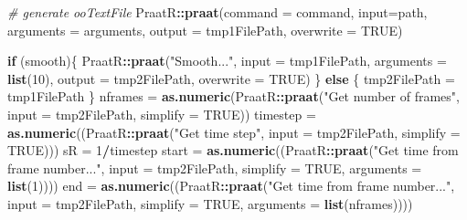 \documentclass[]{book}
\newenvironment{Shaded}{\begin{snugshade}}{\end{snugshade}}
\newcommand{\CommentTok}[1]{\textcolor[rgb]{0.56,0.35,0.01}{\textit{#1}}}
\newcommand{\ControlFlowTok}[1]{\textcolor[rgb]{0.13,0.29,0.53}{\textbf{#1}}}
\newcommand{\DataTypeTok}[1]{\textcolor[rgb]{0.13,0.29,0.53}{#1}}
\newcommand{\DecValTok}[1]{\textcolor[rgb]{0.00,0.00,0.81}{#1}}
\newcommand{\KeywordTok}[1]{\textcolor[rgb]{0.13,0.29,0.53}{\textbf{#1}}}
\newcommand{\NormalTok}[1]{#1}
\newcommand{\OperatorTok}[1]{\textcolor[rgb]{0.81,0.36,0.00}{\textbf{#1}}}
\newcommand{\OtherTok}[1]{\textcolor[rgb]{0.56,0.35,0.01}{#1}}
\newcommand{\StringTok}[1]{\textcolor[rgb]{0.31,0.60,0.02}{#1}}
\begin{document}
\begin{Shaded}
\begin{Highlighting}[]
  \CommentTok{# generate ooTextFile}
\NormalTok{  PraatR}\OperatorTok{::}\KeywordTok{praat}\NormalTok{(}\DataTypeTok{command =}\NormalTok{ command,}
                \DataTypeTok{input=}\NormalTok{path,}
                \DataTypeTok{arguments =}\NormalTok{ arguments,}
                \DataTypeTok{output =}\NormalTok{ tmp1FilePath,}
                \DataTypeTok{overwrite =} \OtherTok{TRUE}\NormalTok{)}
  
  \ControlFlowTok{if}\NormalTok{ (smooth)\{}
\NormalTok{    PraatR}\OperatorTok{::}\KeywordTok{praat}\NormalTok{(}\StringTok{"Smooth..."}\NormalTok{,}
                  \DataTypeTok{input =}\NormalTok{ tmp1FilePath,}
                  \DataTypeTok{arguments =} \KeywordTok{list}\NormalTok{(}\DecValTok{10}\NormalTok{),}
                  \DataTypeTok{output =}\NormalTok{ tmp2FilePath,}
                  \DataTypeTok{overwrite =} \OtherTok{TRUE}\NormalTok{)}
\NormalTok{  \} }\ControlFlowTok{else}\NormalTok{ \{}
\NormalTok{    tmp2FilePath =}\StringTok{ }\NormalTok{tmp1FilePath}
\NormalTok{  \}}
\NormalTok{  nframes =}\StringTok{ }\KeywordTok{as.numeric}\NormalTok{(PraatR}\OperatorTok{::}\KeywordTok{praat}\NormalTok{(}\StringTok{"Get number of frames"}\NormalTok{,}
                                     \DataTypeTok{input =}\NormalTok{ tmp2FilePath,}
                                     \DataTypeTok{simplify =} \OtherTok{TRUE}\NormalTok{))}
\NormalTok{  timestep =}\StringTok{ }\KeywordTok{as.numeric}\NormalTok{((PraatR}\OperatorTok{::}\KeywordTok{praat}\NormalTok{(}\StringTok{"Get time step"}\NormalTok{,}
                                       \DataTypeTok{input =}\NormalTok{ tmp2FilePath,}
                                       \DataTypeTok{simplify =} \OtherTok{TRUE}\NormalTok{)))}
\NormalTok{  sR =}\StringTok{ }\DecValTok{1}\OperatorTok{/}\NormalTok{timestep}
\NormalTok{  start =}\StringTok{ }\KeywordTok{as.numeric}\NormalTok{((PraatR}\OperatorTok{::}\KeywordTok{praat}\NormalTok{(}\StringTok{"Get time from frame number..."}\NormalTok{,}
                                    \DataTypeTok{input =}\NormalTok{ tmp2FilePath,}
                                    \DataTypeTok{simplify =} \OtherTok{TRUE}\NormalTok{,}
                                    \DataTypeTok{arguments =} \KeywordTok{list}\NormalTok{(}\DecValTok{1}\NormalTok{))))}
\NormalTok{  end =}\StringTok{ }\KeywordTok{as.numeric}\NormalTok{((PraatR}\OperatorTok{::}\KeywordTok{praat}\NormalTok{(}\StringTok{"Get time from frame number..."}\NormalTok{,}
                                  \DataTypeTok{input =}\NormalTok{ tmp2FilePath,}
                                  \DataTypeTok{simplify =} \OtherTok{TRUE}\NormalTok{,}
                                  \DataTypeTok{arguments =} \KeywordTok{list}\NormalTok{(nframes))))}
  

\end{Highlighting}
\end{Shaded}
\end{document}
